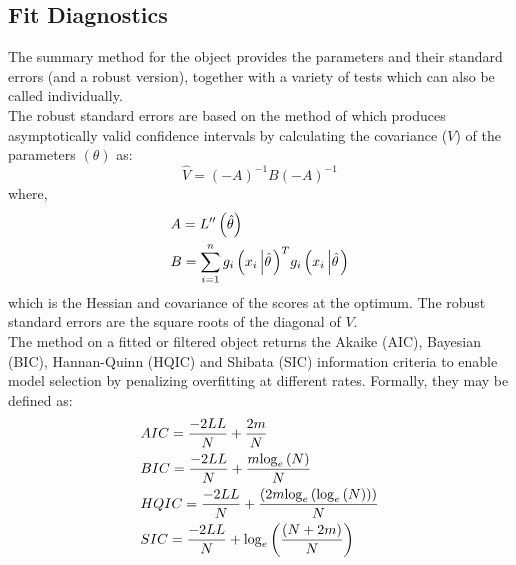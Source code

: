 \subsection{Fit Diagnostics}\label{section:diagnostics}
The summary method for the \verb@uGARCHfit@ object provides the parameters and
their standard errors (and a robust version), together with a variety of tests
which can also be called individually.\\
The robust standard errors are based on the method of \citet{White} which produces
asymptotically valid confidence intervals by calculating the covariance ($V$) of the
parameters $(\theta)$ as:
\begin{equation}
\hat V =  {\left( -A \right)^{ - 1}}B{\left( { - A} \right)^{ - 1}}
\end{equation}
where,
\begin{equation}
\begin{gathered}
  A = L''\left( {\hat \theta } \right) \hfill \\
  B = {\sum\limits_{i = 1}^n {{g_i}\left( {{x_i}\left| {\hat \theta } \right.} \right)} ^T}{g_i}\left( {{x_i}\left| {\hat \theta } \right.} \right) \hfill \\
\end{gathered}
\end{equation}
which is the Hessian and covariance of the scores at the optimum.
The robust standard errors are the square roots of the diagonal of $V$.\\
The \verb@inforcriteria@ method on a fitted or filtered object returns the
Akaike (AIC), Bayesian (BIC), Hannan-Quinn (HQIC) and Shibata (SIC) information
criteria to enable model selection by penalizing overfitting at different rates.
Formally, they may be defined as:
\begin{equation}\label{inforcriteria}
\begin{gathered}
  AIC = \frac{{ - 2LL}}
{N} + \frac{{2m}}
{N} \hfill \\
  BIC = \frac{{ - 2LL}}
{N} + \frac{{m{{\log }_e}\left( N \right)}}
{N} \hfill \\
  HQIC = \frac{{ - 2LL}}
{N} + \frac{{\left( {2m{{\log }_e}\left( {{{\log }_e}\left( N \right)} \right)} \right)}}
{N} \hfill \\
  SIC = \frac{{ - 2LL}}
{N} + {\log _e}\left( {\frac{{\left( {N + 2m} \right)}}
{N}} \right) \hfill \\
\end{gathered}
\end{equation}

